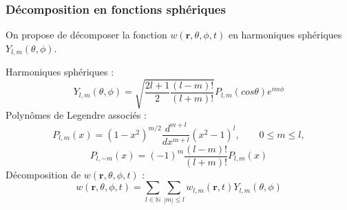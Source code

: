 \begin{frame}
\frametitle{Décomposition en fonctions sphériques}
On propose de décomposer la fonction $w(\textbf{r},\theta,\phi,t)$ en harmoniques sphériques $Y_{l,m}(\theta,\phi)$.

Harmoniques sphériques :
\begin{equation*}
Y_{l,m}(\theta,\phi)=\sqrt{\frac{2l+1}{2}\frac{(l-m)!}{(l+m)!}}P_{l,m}(cos{\theta})e^{im\phi}
\end{equation*}
Polyn\^omes de Legendre associés :
\begin{equation*}
P_{l,m}(x)=(1-x^2)^{m/2}\frac{d^{m+l}}{dx^{m+l}}(x^2-1)^l, \qquad 0\leqslant m\leqslant l,
\end{equation*}
\begin{equation*}
P_{l,-m}(x)=(-1)^m\frac{(l-m)!}{(l+m)!}P_{l,m}(x)
\end{equation*}
Décomposition de $w(\textbf{r},\theta,\phi,t)$ :
\begin{equation}\label{decomposition}
w(\textbf{r},\theta,\phi,t)=\sum\limits_{l\in\mathbb{N}}\sum\limits_{|m|\leqslant l}w_{l,m}(\textbf{r},t)Y_{l,m}(\theta,\phi)
\end{equation}
\end{frame}

